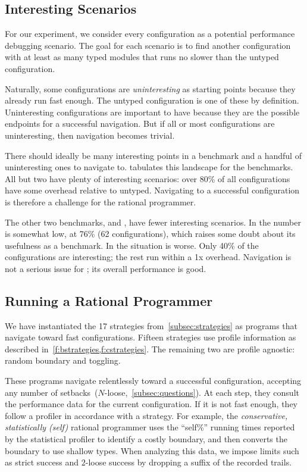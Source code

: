 \subsection{Interesting Scenarios}

For our experiment, we consider every configuration as a potential
performance debugging scenario.
The goal for each scenario is to find another configuration
with at least as many typed modules that runs no slower than the
untyped configuration.

Naturally, some configurations are \emph{uninteresting} as starting
points because they already run fast enough.
The untyped configuration is one of these by definition.
Uninteresting configurations are important to have because they
are the possible endpoints for a successful navigation.
But if all or most configurations are uninteresting, then
navigation becomes trivial.

There should ideally be many interesting points in a benchmark
and a handful of uninteresting ones to navigate to.
 tabulates this landscape for the benchmarks.
All but two have plenty of interesting scenarios: over 80\% of
all configurations have some overhead relative to untyped.
Navigating to a successful configuration is therefore a challenge
for the rational programmer.

The other two benchmarks,  and , have
fewer interesting scenarios.
In  the number is somewhat low, at 76\% (62 configurations),
which raises some doubt about its usefulness as a benchmark.
In  the situation is worse.
Only 40\% of the configurations are interesting; the rest run within a 1x
overhead.
Navigation is not a serious issue for ; its overall
performance is good.



\subsection{Running a Rational Programmer}

We have instantiated the 17 strategies from~\cref{subsec:strategies} as
programs that navigate toward fast configurations.
Fifteen strategies use profile information as described in~\cref{f:bstrategies,f:cstrategies}.
The remaining two are profile agnostic: random boundary and toggling.

These programs navigate relentlessly toward a successful configuration,
accepting any number of setbacks~($N$-loose,~\cref{subsec:questions}).
At each step, they consult the performance data for the current configuration.
If it is not fast enough, they follow a profiler in accordance with a strategy.
For example, the \emph{conservative, statistically (self)} rational programmer
uses the ``self\%'' running times reported by the statistical profiler to
identify a costly boundary, and then converts the boundary to use shallow types.
When analyzing this data, we impose limits such as strict success and
$2$-loose success by dropping a suffix of the recorded trails.

